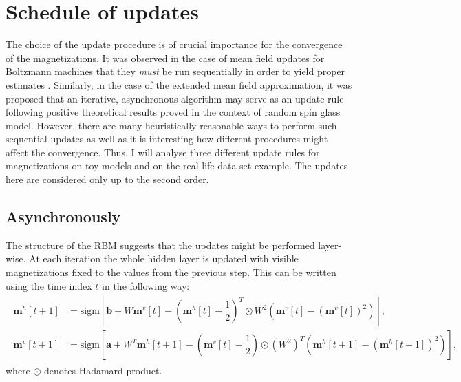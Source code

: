 \section{Schedule of updates}
The choice of the update procedure is of crucial importance for the convergence of the magnetizations. It was observed in the case of mean field updates for Boltzmann machines that they \emph{must} be run sequentially in order to yield proper estimates \cite{welling2002new}. Similarly, in the case of the extended mean field approximation, it was proposed that an iterative, asynchronous algorithm may serve as an update rule \cite{gabrie2015training} following positive theoretical results proved in the context of random spin glass model. However, there are many heuristically reasonable ways to perform such sequential updates as well as it is interesting how different procedures might affect the convergence. Thus, I will analyse three different update rules for magnetizations on toy models and on the real life data set example. The updates here are considered only up to the second order.

\subsection{Asynchronously}
The structure of the RBM suggests that the updates might be performed layer-wise. At each iteration the whole hidden layer is updated with visible magnetizations fixed to the values from the previous step. This can be written using the time index $t$ in the following way: 
\begin{align}
\begin{split}
\mathbf{m}^h [t+1] & = \text{sigm} \left[  \mathbf{b} + W \mathbf{m}^v[t] - \left( \mathbf{m}^h[t] - \dfrac{1}{2}\right)^T \odot W^2 \left( \mathbf{m}^v[t] - ( \mathbf{m}^v[t])^2 \right) \right], \\
\mathbf{m}^v[t+1] & = \text{sigm} \left[  \mathbf{a} + W^T \mathbf{m}^h[t + 1] -\left( \mathbf{m}^v[t] - \dfrac{1}{2}\right) \odot (W^2)^T  \left(\mathbf{m}^h[t+1] - (\mathbf{m}^h[t+1])^2 \right) \right],
\label{eq:asynch}
\end{split}
\end{align}
where $\odot$ denotes Hadamard product. 

